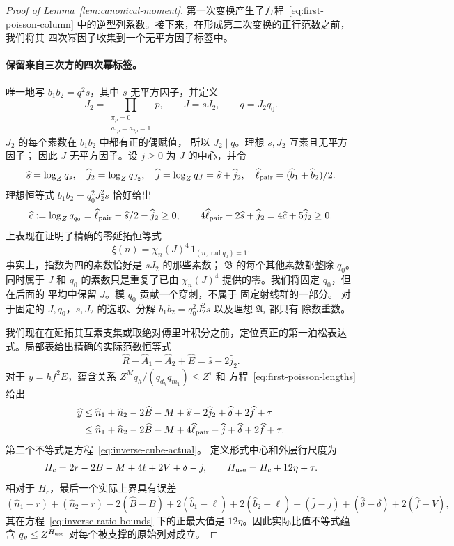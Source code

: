 \documentclass[11pt,a4paper]{article}
\numberwithin{equation}{section}
\numberwithin{figure}{section}
\theoremstyle{definition}
\theoremstyle{remark}
\begin{document}
\begin{proof}[Proof of Lemma~\ref{lem:canonical-moment}]
第一次变换产生了方程~\eqref{eq:first-poisson-column} 中的逆型列系数。接下来，在形成第二次变换的正行范数之前，我们将其
四次幂因子收集到一个无平方因子标签中。\paragraph{保留来自三次方的四次幂标签。}
唯一地写 \(b_1b_2=q^2s\)，其中 \(s\) 无平方因子，并定义
\[
 J_2=\prod_{\substack{\pi_p=0\\a_{1p}=a_{2p}=1}}p,\qquad
 J=sJ_2,\qquad q=J_2q_0.
\]
\(J_2\) 的每个素数在 \(b_1b_2\) 中都有正的偶赋值，
所以 \(J_2\mid q\)。理想 \(s,J_2\) 互素且无平方因子；
因此 \(J\) 无平方因子。设 \(j\ge0\) 为 \(J\) 的中心，并令
\[
 \widehat s=\log_Zq_s,\quad \widehat j_2=\log_Zq_{J_2},\quad
 \widehat j=\log_Zq_J=\widehat s+\widehat j_2,\quad
 \widehat\ell_{\rm pair}=(\widehat b_1+\widehat b_2)/2.
\]
理想恒等式 \(b_1b_2=q_0^2J_2^2s\) 恰好给出
\begin{equation}\label{eq:inverse-cube-actual}
 \widehat c:=\log_Zq_{q_0}
   =\widehat\ell_{\rm pair}-\widehat s/2-\widehat j_2\ge0,
 \qquad
 4\widehat\ell_{\rm pair}-2\widehat s+\widehat j_2
   =4\widehat c+5\widehat j_2\ge0.
\end{equation}
上表现在证明了精确的零延拓恒等式
\begin{equation}\label{eq:retained-cube-label}
 \xi(n)=\chi_n(J)^4\,1_{(n,\operatorname{rad}q_0)=1}.
\end{equation}
事实上，指数为四的素数恰好是 \(sJ_2\) 的那些素数；
\(\mathfrak B\) 的每个其他素数都整除 \(q_0\)。同时属于
\(J\) 和 \(q_0\) 的素数只是重复了已由
\(\chi_n(J)^4\) 提供的零。我们将固定 \(q_0\)，但在后面的
平均中保留 \(J\)。模 \(q_0\) 贡献一个穿刺，不属于
固定射线群的一部分。
对于固定的 \(J,q_0\)，\(s,J_2\) 的选取、分解
\(b_1b_2=q_0^2J_2^2s\) 以及理想 \(\mathfrak A_i\) 都只有
除数重数。

我们现在在延拓其互素支集或取绝对傅里叶积分之前，定位真正的第一泊松表达式。局部表给出精确的实际范数恒等式
\[
 \widehat R-\widehat A_1-\widehat A_2+\widehat E
       =\widehat s-2\widehat j_2.
\]
对于 \(y=hf^2E\)，蕴含关系
\(Z^Mq_h/(q_{d_k}q_{m_1})\le Z^\tau\) 和
方程~\eqref{eq:first-poisson-lengths} 给出
\[
 \begin{split}
 \widehat y
 &\le \widehat n_1+\widehat n_2-2\widehat B-M
       +\widehat s-2\widehat j_2+\widehat\delta+2\widehat f+\tau\\
 &\le \widehat n_1+\widehat n_2-2\widehat B-M
       +4\widehat\ell_{\rm pair}-\widehat j
       +\widehat\delta+2\widehat f+\tau.
 \end{split}
\]
第二个不等式是方程~\eqref{eq:inverse-cube-actual}。
定义形式中心和外层行尺度为
\begin{equation}\label{eq:enlarged-first-frequency}
 H_c=2r-2B-M+4\ell+2V+\delta-j,\qquad
 H_{\rm use}=H_c+12\eta+\tau.
\end{equation}
相对于 \(H_c\)，最后一个实际上界具有误差
\[
 (\widehat n_1-r)+(\widehat n_2-r)-2(\widehat B-B)
 +2(\widehat b_1-\ell)+2(\widehat b_2-\ell)
 -(\widehat j-j)+(\widehat\delta-\delta)+2(\widehat f-V),
\]
其在方程~\eqref{eq:inverse-ratio-bounds} 下的正最大值是
\(12\eta\)。因此实际比值不等式蕴含
\(q_y\le Z^{H_{\rm use}}\) 对每个被支撑的原始列对成立。


\end{proof}
\end{document}
